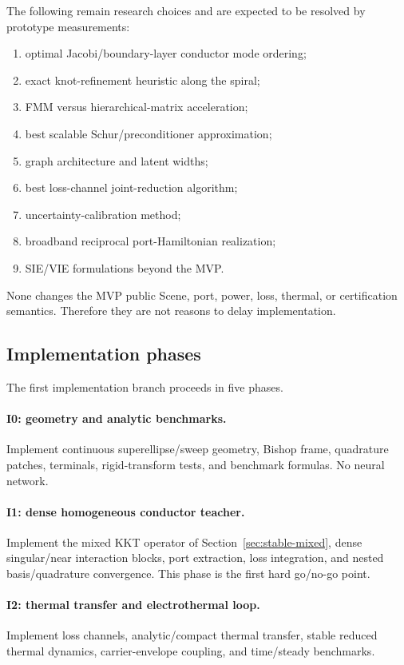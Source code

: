 The following remain research choices and are expected to be resolved by
prototype measurements:
\begin{enumerate}
\item optimal Jacobi/boundary-layer conductor mode ordering;
\item exact knot-refinement heuristic along the spiral;
\item FMM versus hierarchical-matrix acceleration;
\item best scalable Schur/preconditioner approximation;
\item graph architecture and latent widths;
\item best loss-channel joint-reduction algorithm;
\item uncertainty-calibration method;
\item broadband reciprocal port-Hamiltonian realization;
\item SIE/VIE formulations beyond the MVP.
\end{enumerate}
None changes the MVP public Scene, port, power, loss, thermal, or certification
semantics. Therefore they are not reasons to delay implementation.

\subsection{Implementation phases}

The first implementation branch proceeds in five phases.

\paragraph{I0: geometry and analytic benchmarks.}
Implement continuous superellipse/sweep geometry, Bishop frame, quadrature
patches, terminals, rigid-transform tests, and benchmark formulas. No neural
network.

\paragraph{I1: dense homogeneous conductor teacher.}
Implement the mixed KKT operator of Section~\ref{sec:stable-mixed}, dense
singular/near interaction blocks, port extraction, loss integration, and nested
basis/quadrature convergence. This phase is the first hard go/no-go point.

\paragraph{I2: thermal transfer and electrothermal loop.}
Implement loss channels, analytic/compact thermal transfer, stable reduced
thermal dynamics, carrier-envelope coupling, and time/steady benchmarks.

